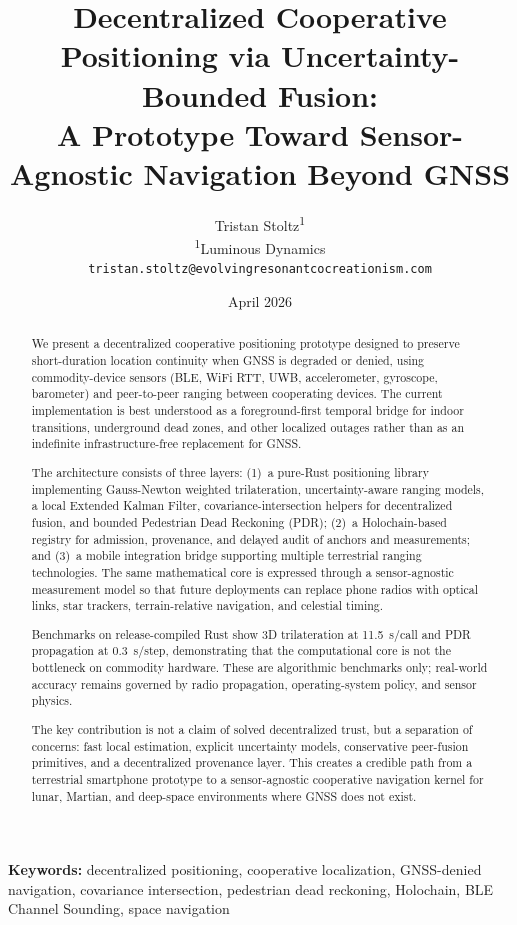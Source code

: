 \documentclass[12pt,a4paper]{article}
\title{Decentralized Cooperative Positioning via Uncertainty-Bounded Fusion:\\
A Prototype Toward Sensor-Agnostic Navigation Beyond GNSS}
\author{
Tristan Stoltz\textsuperscript{1}\\[4pt]
\textsuperscript{1}Luminous Dynamics\\
\texttt{tristan.stoltz@evolvingresonantcocreationism.com}
}
\date{April 2026}
\begin{document}
\maketitle

\begin{abstract}
We present a decentralized cooperative positioning prototype designed to preserve short-duration location continuity when GNSS is degraded or denied, using commodity-device sensors (BLE, WiFi RTT, UWB, accelerometer, gyroscope, barometer) and peer-to-peer ranging between cooperating devices. The current implementation is best understood as a foreground-first temporal bridge for indoor transitions, underground dead zones, and other localized outages rather than as an indefinite infrastructure-free replacement for GNSS.

The architecture consists of three layers: (1)~a pure-Rust positioning library implementing Gauss-Newton weighted trilateration, uncertainty-aware ranging models, a local Extended Kalman Filter, covariance-intersection helpers for decentralized fusion, and bounded Pedestrian Dead Reckoning (PDR); (2)~a Holochain-based registry for admission, provenance, and delayed audit of anchors and measurements; and (3)~a mobile integration bridge supporting multiple terrestrial ranging technologies. The same mathematical core is expressed through a sensor-agnostic measurement model so that future deployments can replace phone radios with optical links, star trackers, terrain-relative navigation, and celestial timing.

Benchmarks on release-compiled Rust show 3D trilateration at 11.5~\textmu s/call and PDR propagation at 0.3~\textmu s/step, demonstrating that the computational core is not the bottleneck on commodity hardware. These are algorithmic benchmarks only; real-world accuracy remains governed by radio propagation, operating-system policy, and sensor physics.

The key contribution is not a claim of solved decentralized trust, but a separation of concerns: fast local estimation, explicit uncertainty models, conservative peer-fusion primitives, and a decentralized provenance layer. This creates a credible path from a terrestrial smartphone prototype to a sensor-agnostic cooperative navigation kernel for lunar, Martian, and deep-space environments where GNSS does not exist.
\end{abstract}

\textbf{Keywords:} decentralized positioning, cooperative localization, GNSS-denied navigation, covariance intersection, pedestrian dead reckoning, Holochain, BLE Channel Sounding, space navigation
\end{document}

